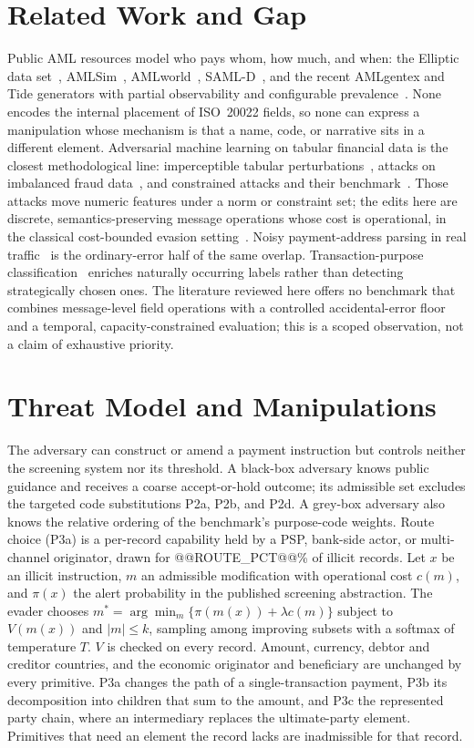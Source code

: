 \documentclass[conference]{IEEEtran}
\begin{document}
\section{Related Work and Gap}
Public AML resources model who pays whom, how much, and when: the Elliptic
data set~\cite{weber2019}, AMLSim~\cite{suzumura2021},
AMLworld~\cite{altman2023}, SAML-D~\cite{oztas2023}, and the recent AMLgentex
and Tide generators with partial observability and configurable
prevalence~\cite{ostman2025,beukel2026}. None encodes the internal placement
of ISO~20022 fields, so none can express a manipulation whose mechanism is
that a name, code, or narrative sits in a different element. Adversarial
machine learning on tabular financial data is the closest methodological
line: imperceptible tabular perturbations~\cite{ballet2019}, attacks on
imbalanced fraud data~\cite{cartella2021}, and constrained attacks and their
benchmark~\cite{simonetto2022,simonetto2024}. Those attacks move numeric
features under a norm or constraint set; the edits here are discrete,
semantics-preserving message operations whose cost is operational, in the
classical cost-bounded evasion setting~\cite{bruckner2011,biggio2013}. Noisy
payment-address parsing in real traffic~\cite{hammami2024} is the
ordinary-error half of the same overlap. Transaction-purpose
classification~\cite{busson2023} enriches naturally occurring labels rather
than detecting strategically chosen ones. The literature reviewed here offers no benchmark that combines
message-level field operations with a controlled accidental-error floor and
a temporal, capacity-constrained evaluation; this is a scoped observation,
not a claim of exhaustive priority.

\section{Threat Model and Manipulations}
The adversary can construct or amend a payment instruction but controls
neither the screening system nor its threshold. A black-box adversary knows
public guidance and receives a coarse accept-or-hold outcome; its admissible
set excludes the targeted code substitutions P2a, P2b, and P2d. A grey-box
adversary also knows the relative ordering of the benchmark's purpose-code
weights. Route choice (P3a) is a per-record capability held by a PSP,
bank-side actor, or multi-channel originator, drawn for @@ROUTE_PCT@@\% of
illicit records. Let $x$ be an illicit instruction, $m$ an admissible
modification with operational cost $c(m)$, and $\pi(x)$ the alert probability
in the published screening abstraction. The evader chooses
$m^*=\arg\min_m\{\pi(m(x))+\lambda c(m)\}$ subject to $V(m(x))$ and $|m|\le
k$, sampling among improving subsets with a softmax of temperature $T$. $V$ is
checked on every record. Amount, currency, debtor and creditor countries, and
the economic originator and beneficiary are unchanged by every primitive.
P3a changes the path of a single-transaction payment, P3b its decomposition
into children that sum to the amount, and P3c the represented party chain,
where an intermediary replaces the ultimate-party element. Primitives that
need an element the record lacks are inadmissible for that record.
\end{document}
